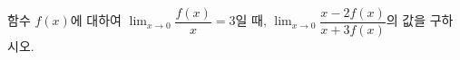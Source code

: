 함수 $f(x)$에 대하여 $\displaystyle\lim_{x\to 0}\dfrac{f(x)}{x}=3$일 때, $\displaystyle\lim_{x\to 0}\dfrac{x-2f(x)}{x+3f(x)}$의 값을 구하시오.
